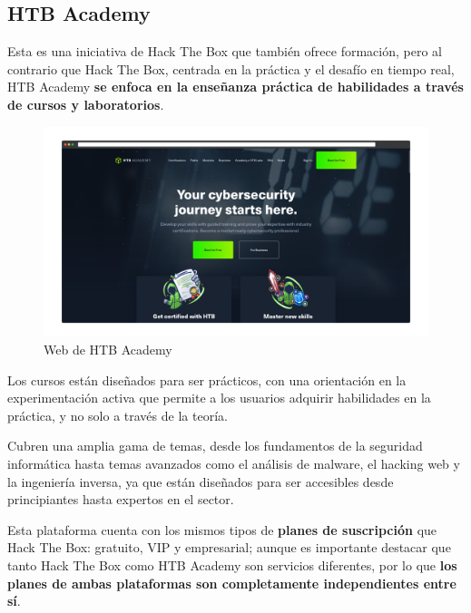         \newpage

    
    \subsection{HTB Academy}
    
        Esta es una iniciativa de Hack The Box que también ofrece formación, pero al contrario que Hack The Box, centrada en la práctica y el desafío en tiempo real, HTB Academy \textbf{se enfoca en la enseñanza práctica de habilidades a través de cursos y laboratorios}.
        
        \begin{figure}[h]
            \centering

            \includegraphics[width=\textwidth]{images/Capturas/Web de HTB Academy.png}
            
            \caption{Web de HTB Academy}
            \label{fig:HTB-Academy-web}
        \end{figure}
        
        Los cursos están diseñados para ser prácticos, con una orientación en la experimentación activa que permite a los usuarios adquirir habilidades en la práctica, y no solo a través de la teoría.
        
        Cubren una amplia gama de temas, desde los fundamentos de la seguridad informática hasta temas avanzados como el análisis de malware, el hacking web y la ingeniería inversa, ya que están diseñados para ser accesibles desde principiantes hasta expertos en el sector.
        
        Esta plataforma cuenta con los mismos tipos de \textbf{planes de suscripción} que Hack The Box: gratuito, VIP y empresarial; aunque es importante destacar que tanto Hack The Box como HTB Academy son servicios diferentes, por lo que \textbf{los planes de ambas plataformas son completamente independientes entre sí}.
        
